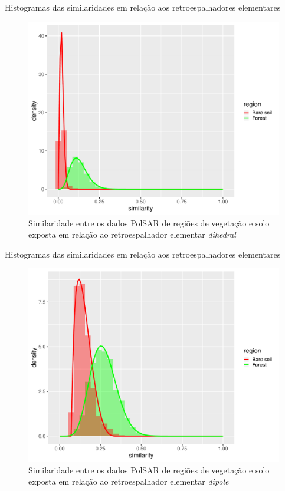\documentclass{beamer} %
\begin{document}
\begin{frame}{Histogramas das similaridades em relação aos retroespalhadores elementares}

\begin{figure}
    \centering
    \includegraphics[width = .6\linewidth]{di.pdf}
    \caption{Similaridade entre os dados PolSAR de regiões de vegetação e solo exposta em relação ao retroespalhador elementar \textit{dihedral}}
    \label{fig:di}
\end{figure}
    
\end{frame}

\begin{frame}{Histogramas das similaridades em relação aos retroespalhadores elementares}

\begin{figure}
    \centering
    \includegraphics[width = .6\linewidth]{dip.pdf}
    \caption{Similaridade entre os dados PolSAR de regiões de vegetação e solo exposta em relação ao retroespalhador elementar \textit{dipole}}
    \label{fig:dip}
\end{figure}
    
\end{frame}
\end{document}
